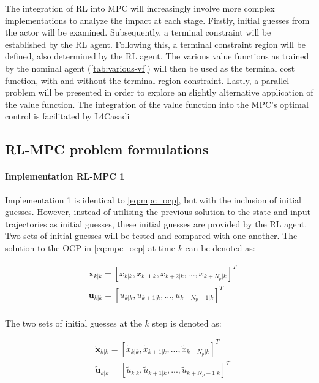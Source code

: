 The integration of RL into MPC will increasingly involve more complex implementations to analyze the impact at each stage. Firstly, initial guesses from the actor will be examined. Subsequently, a terminal constraint will be established by the RL agent. Following this, a terminal constraint region will be defined, also determined by the RL agent. The various value functions as trained by the nominal agent (\autoref{tab:various-vf}) will then be used as the terminal cost function, with and without the terminal region constraint. Lastly, a parallel problem will be presented in order to explore an slightly alternative application of the value function. The integration of the value function into the MPC's optimal control is facilitated by L4Casadi \cite{}

\subsection{RL-MPC problem formulations}

\paragraph{Implementation RL-MPC 1}
Implementation 1 is identical to \autoref{eq:mpc_ocp}, but with the inclusion of initial guesses. However, instead of utilising the previous solution to the state and input trajectories as initial guesses, these initial guesses are provided by the RL agent. Two sets of initial guesses will be tested and compared with one another. The solution to the OCP in \autoref{eq:mpc_ocp} at time $k$  can be denoted as:

\begin{equation}\label{eq:sol-mpc-ocp}
	\begin{aligned}
		&\mathbf{x}_{k|k} = [x_{k|k},x_{k_+ 1|k},x_{k + 2|k}, ...,x_{k + N_p|k}]^T \\ 
		&\mathbf{u}_{k|k} = [u_{k|k},u_{k + 1|k}, ...,u_{k + N_p-1|k}]^T \\
	\end{aligned}
\end{equation}

The two sets of initial guesses at the $k$ step is denoted as:

\begin{equation}\label{eq:initial-guess-1}
	\begin{aligned}
		&\tilde{\mathbf{x}}_{k|k} = [\tilde{x}_{k|k},\tilde{x}_{k+1|k},...,\tilde{x}_{k + N_p|k}]^T \\ 
		&\tilde{\mathbf{u}}_{k|k} = [\tilde{u}_{k|k},\tilde{u}_{k + 1|k},...,\tilde{u}_{k + N_p - 1|k}]^T\\ 
	\end{aligned}
\end{equation}


